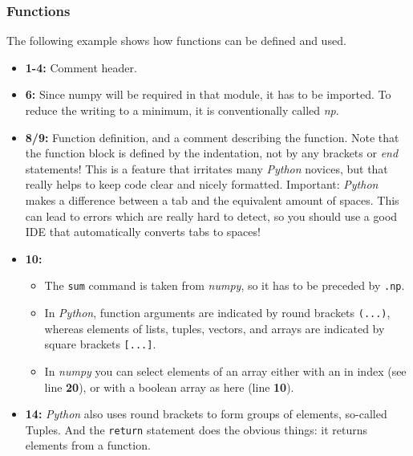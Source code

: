 \subsubsection{Functions}
The following example shows how functions can be defined and used.



\begin{itemize}
  \item \textbf{1-4:} Comment header.

  \item \textbf{6:} Since numpy will be required in that module, it has to be imported. To reduce the writing to a minimum, it is conventionally called \emph{np}.

  \item \textbf{8/9:} Function definition, and a comment describing the function. Note that the function block is defined by the indentation, not by any brackets or \emph{end} statements! This is a feature that irritates many \emph{Python} novices, but that really helps to keep code clear and nicely formatted. Important: \emph{Python} makes a difference between a tab and the equivalent amount of spaces. This can lead to errors which are really hard to detect, so you should use a good IDE that automatically converts tabs to spaces!

  \item \textbf{10:}
    \begin{itemize}
      \item The \lstinline{sum} command is taken from \emph{numpy}, so it has to be preceded by \lstinline{.np}.
      \item In \emph{Python}, function arguments are indicated by round brackets \lstinline{(...)}, whereas elements of lists, tuples, vectors, and arrays are indicated by square brackets \lstinline{[...]}.
      \item In \emph{numpy} you can select elements of an array either with an in index (see line \textbf{20}), or with a boolean array as here (line \textbf{10}).
    \end{itemize}

  \item \textbf{14:} \emph{Python} also uses round brackets to form groups of elements, so-called Tuples. And the \lstinline{return} statement does the obvious things: it returns elements from a function.


\end{itemize}

